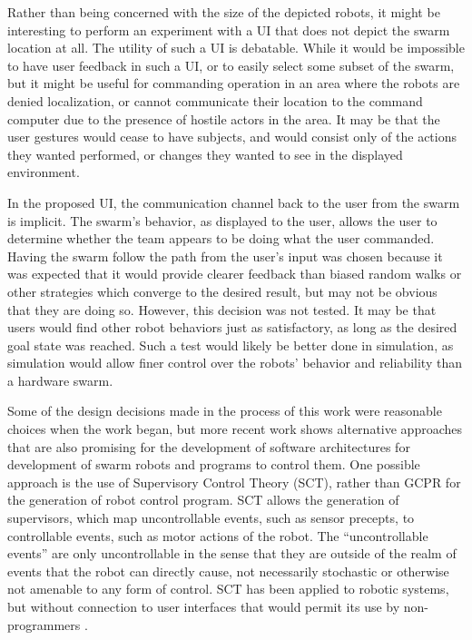 Rather than being concerned with the size of the depicted robots, it might be interesting to perform an experiment with a UI that does not depict the swarm location at all. 
The utility of such a UI is debatable.
While it would be impossible to have user feedback in such a UI, or to easily select some subset of the swarm, but it might be useful for commanding operation in an area where the robots are denied localization, or cannot communicate their location to the command computer due to the presence of hostile actors in the area. 
It may be that the user gestures would cease to have subjects, and would consist only of the actions they wanted performed, or changes they wanted to see in the displayed environment. 
	
In the proposed UI, the communication channel back to the user from the swarm is implicit. 
The swarm's behavior, as displayed to the user, allows the user to determine whether the team appears to be doing what the user commanded. 
Having the swarm follow the path from the user's input was chosen because it was expected that it would provide clearer feedback than biased random walks or other strategies which converge to the desired result, but may not be obvious that they are doing so. 
However, this decision was not tested. 
It may be that users would find other robot behaviors just as satisfactory, as long as the desired goal state was reached. 
Such a test would likely be better done in simulation, as simulation would allow finer control over the robots' behavior and reliability than a hardware swarm. 

Some of the design decisions made in the process of this work were reasonable choices when the work began, but more recent work shows alternative approaches that are also promising for the development of software architectures for development of swarm robots and programs to control them.
One possible approach is the use of Supervisory Control Theory (SCT), rather than GCPR for the generation of robot control program. 
SCT allows the generation of supervisors, which map uncontrollable events, such as sensor precepts, to controllable events, such as motor actions of the robot. 
The ``uncontrollable events'' are only uncontrollable in the sense that they are outside of the realm of events that the robot can directly cause, not necessarily stochastic or otherwise not amenable to any form of control. 
SCT has been applied to robotic systems, but without connection to user interfaces that would permit its use by non-programmers \citep{lopes2014application, lopes2016supervisory}.

